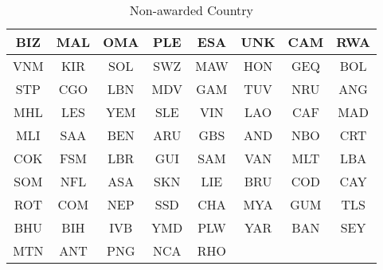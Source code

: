 \begin{table}[H]
\centering
\caption{Non-awarded Country}
\vspace{-6pt} 
\label{tab2}
\begin{tabular}{|c|c|c|c|c|c|c|c|}
\hline
BIZ & MAL & OMA & PLE & ESA & UNK & CAM & RWA \\ \hline
VNM & KIR & SOL & SWZ & MAW & HON & GEQ & BOL \\ \hline
STP & CGO & LBN & MDV & GAM & TUV & NRU & ANG \\ \hline
MHL & LES & YEM & SLE & VIN & LAO & CAF & MAD \\ \hline
MLI & SAA & BEN & ARU & GBS & AND & NBO & CRT \\ \hline
COK & FSM & LBR & GUI & SAM & VAN & MLT & LBA \\ \hline
SOM & NFL & ASA & SKN & LIE & BRU & COD & CAY \\ \hline
ROT & COM & NEP & SSD & CHA & MYA & GUM & TLS \\ \hline
BHU & BIH & IVB & YMD & PLW & YAR & BAN & SEY \\ \hline
MTN & ANT & PNG & NCA & RHO &   &   &   \\ \hline
\end{tabular}
\end{table}